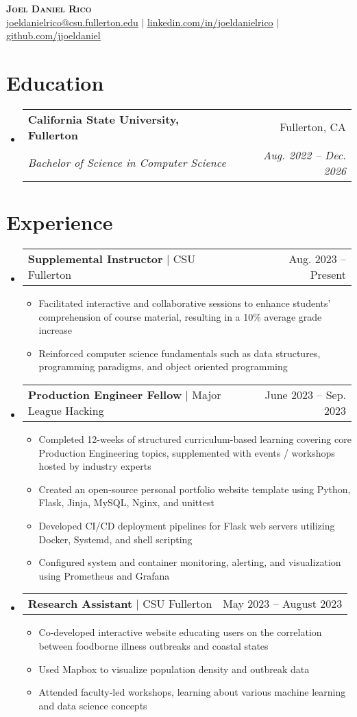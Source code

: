 \documentclass[letterpaper,11pt]{article}
\makeatletter
\newcommand{\resumeItem}[1]{
  \item\small{
    {#1 \vspace{-2pt}}
  }
}
\newcommand{\resumeSubheading}[4]{
  \vspace{-2pt}\item
    \begin{tabular*}{0.97\textwidth}[t]{l@{\extracolsep{\fill}}r}
      \textbf{#1} & #2 \\
      \textit{\small#3} & \textit{\small #4} \\
    \end{tabular*}\vspace{-7pt}
}
\newcommand{\resumeProjectHeading}[2]{
    \item
    \begin{tabular*}{0.97\textwidth}{l@{\extracolsep{\fill}}r}
      \small#1 & #2 \\
    \end{tabular*}\vspace{-7pt}
}
\newcommand{\resumeSubHeadingListStart}{\begin{itemize}[leftmargin=0.15in, label={}]}
\newcommand{\resumeSubHeadingListEnd}{\end{itemize}}
\newcommand{\resumeItemListStart}{\begin{itemize}}
\newcommand{\resumeItemListEnd}{\end{itemize}\vspace{-5pt}}
\makeatother
\begin{document}
\begin{center}
    \textbf{\Huge \scshape Joel Daniel Rico} \\ \vspace{1pt}
    \small \href{mailto:joeldanielrico@csu.fullerton.edu.com}{\underline{joeldanielrico@csu.fullerton.edu}} $|$ 
    \href{https://linkedin.com/in/joeldanielrico}{\underline{linkedin.com/in/joeldanielrico}} $|$
    \href{https://github.com/jjoeldaniel}{\underline{github.com/jjoeldaniel }}
\end{center}

\section{Education}
  \resumeSubHeadingListStart
    \resumeSubheading
      {California State University, Fullerton}{Fullerton, CA}
      {Bachelor of Science in Computer Science}{Aug. 2022 -- Dec. 2026}
  \resumeSubHeadingListEnd

\section{Experience}
  \resumeSubHeadingListStart
    \resumeProjectHeading
            {\textbf{Supplemental Instructor} $|$ {CSU Fullerton}}{Aug. 2023 -- Present}
            \resumeItemListStart
              \resumeItem{Facilitated interactive and collaborative sessions to enhance students' comprehension of course material, resulting in a 10\% average grade increase}
              \resumeItem{Reinforced computer science fundamentals such as data structures, programming paradigms, and object oriented programming}
    \resumeItemListEnd
    \resumeProjectHeading
          {\textbf{Production Engineer Fellow} $|$ {Major League Hacking}}{June 2023 -- Sep. 2023}
          \resumeItemListStart
            \resumeItem{Completed 12-weeks of structured curriculum-based learning covering core Production Engineering topics, supplemented with events / workshops hosted by industry experts}
            \resumeItem{Created an open-source personal portfolio website template using Python, Flask, Jinja, MySQL, Nginx, and unittest}
            \resumeItem{Developed CI/CD deployment pipelines for Flask web servers utilizing Docker, Systemd, and shell scripting}
            \resumeItem{Configured system and container monitoring, alerting, and visualization using Prometheus and Grafana}
          \resumeItemListEnd
    \resumeProjectHeading
          {\textbf{Research Assistant} $|$ {CSU Fullerton}}{May 2023 -- August 2023}
          \resumeItemListStart
            \resumeItem{Co-developed interactive website educating users on the correlation between foodborne illness outbreaks and coastal states}
            \resumeItem{Used Mapbox to visualize population density and outbreak data}
            \resumeItem{Attended faculty-led workshops, learning about various machine learning and data science concepts}
          \resumeItemListEnd
  \resumeSubHeadingListEnd
\end{document}
